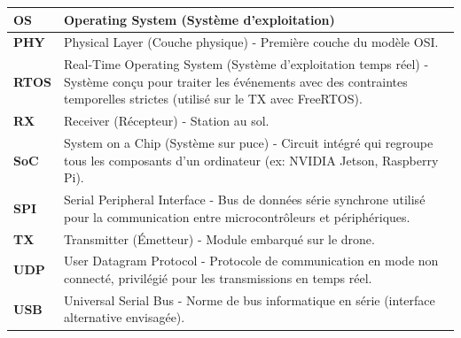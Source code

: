 \begin{longtable}{|l|p{12cm}|}
\hline
\textbf{OS} & Operating System (Système d'exploitation) \\
\hline
\textbf{PHY} & Physical Layer (Couche physique) - Première couche du modèle OSI. \\
\hline
\textbf{RTOS} & Real-Time Operating System (Système d'exploitation temps réel) - Système conçu pour traiter les événements avec des contraintes temporelles strictes (utilisé sur le TX avec FreeRTOS). \\
\hline
\textbf{RX} & Receiver (Récepteur) - Station au sol. \\
\hline
\textbf{SoC} & System on a Chip (Système sur puce) - Circuit intégré qui regroupe tous les composants d'un ordinateur (ex: NVIDIA Jetson, Raspberry Pi). \\
\hline
\textbf{SPI} & Serial Peripheral Interface - Bus de données série synchrone utilisé pour la communication entre microcontrôleurs et périphériques. \\
\hline
\textbf{TX} & Transmitter (Émetteur) - Module embarqué sur le drone. \\
\hline
\textbf{UDP} & User Datagram Protocol - Protocole de communication en mode non connecté, privilégié pour les transmissions en temps réel. \\
\hline
\textbf{USB} & Universal Serial Bus - Norme de bus informatique en série (interface alternative envisagée). \\
\end{longtable}